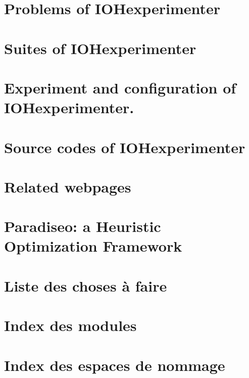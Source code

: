 \let\mypdfximage\pdfximage\def\pdfximage{\immediate\mypdfximage}\documentclass[twoside]{book}
\newcommand{\+}{\discretionary{\mbox{\scriptsize$\hookleftarrow$}}{}{}}
\begin{document}
\chapter{Problems of I\+O\+Hexperimenter}
\label{md__i_o_hexperimenter_src__problems__r_e_a_d_m_e}

\chapter{Suites of I\+O\+Hexperimenter}
\label{md__i_o_hexperimenter_src__suites__r_e_a_d_m_e}

\chapter{Experiment and configuration of I\+O\+Hexperimenter.}
\label{md__i_o_hexperimenter_src__template__experiments__r_e_a_d_m_e}

\chapter{Source codes of I\+O\+Hexperimenter}
\label{md__i_o_hexperimenter_src__template__r_e_a_d_m_e}

\chapter{Related webpages}
\label{webpages}

\chapter{Paradiseo\+: a Heuristic Optimization Framework}
\label{md__r_e_a_d_m_e}

\chapter{Liste des choses à faire}
\label{todo}

\chapter{Index des modules}

\chapter{Index des espaces de nommage}

\end{document}
